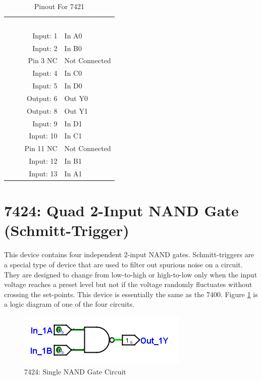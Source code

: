 \begin{table}[H]
	\sffamily
	\newcommand{\head}[1]{\textcolor{white}{\textbf{#1}}}		
	\begin{center}
		\begin{tabular}{rl} 
			\rowcolor{black!75}
			\head{Logisim Label} & \head{Function} \\
			Input: 1   & In A0  \\
			Input: 2   & In B0  \\
			Pin 3 NC   & Not Connected \\
			Input: 4   & In C0  \\
			Input: 5   & In D0  \\
			Output: 6  & Out Y0 \\
			Output: 8  & Out Y1 \\
			Input: 9   & In D1  \\
			Input: 10  & In C1  \\
			Pin 11 NC  & Not Connected \\
			Input: 12 & In B1  \\
			Input: 13  & In A1  \\
		\end{tabular}
	\end{center}
	\caption{Pinout For 7421}
	\label{tab:50-7421}
\end{table}

\section{7424: Quad 2-Input NAND Gate (Schmitt-Trigger)}

This device contains four independent 2-input NAND gates. Schmitt-triggers are a special type of device that are used to filter out spurious noise on a circuit. They are designed to change from low-to-high or high-to-low only when the input voltage reaches a preset level but not if the voltage randomly fluctuates without crossing the set-points. This device is essentially the same as the 7400.  Figure \ref{fig:50-7424} is a logic diagram of one of the four circuits.

\begin{figure}[H]
	\centering
	\includegraphics{gfx/50-7400}
	\caption{7424: Single NAND Gate Circuit}
	\label{fig:50-7424}
\end{figure}

